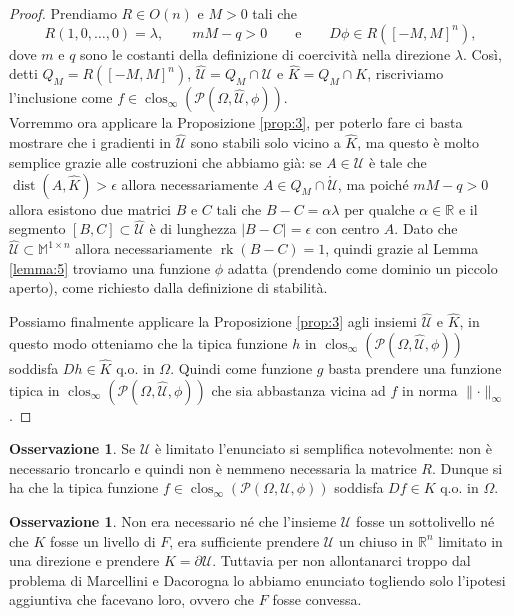 \documentclass[a4paper,11pt]{book}
\theoremstyle{plain}
\theoremstyle{definition}
\newtheorem{oss}[defn]{Osservazione}
\theoremstyle{remark}
\newcommand{\R}{\mathbb{R}}
\newcommand{\M}{\mathbb{M}}
\newcommand{\norm}[1]{\lVert#1\rVert}
\DeclareMathOperator{\rk}{rk}
\DeclareMathOperator{\dist}{dist}
\DeclareMathOperator{\clos}{clos}
\begin{document}
\begin{proof}
	Prendiamo $R\in O(n)$ e $M>0$ tali che
	\[
		R(1,0,\ldots,0)=\lambda,\qquad mM-q>0\qquad\text{e}\qquad D\phi\in R([-M,M]^n),
	\]
	dove $m$ e $q$ sono le costanti della definizione di coercività nella direzione $\lambda$.
	Così, detti $Q_{M}=R([-M,M]^{n})$, $\hat{\mathcal{U}}=Q_{M}\cap\mathcal{U}$ e $\hat{K}=Q_{M}\cap K$, riscriviamo l'inclusione come $f\in\clos_{\infty}(\mathscr{P}(\Omega,\hat{\mathcal{U}},\phi))$.\\
	Vorremmo ora applicare la Proposizione \ref{prop:3}, per poterlo fare ci basta mostrare che i gradienti in $\hat{\mathcal{U}}$ sono stabili solo vicino a $\hat{K}$, ma questo è molto semplice grazie alle costruzioni che abbiamo già: se $A\in\hat{\mathcal{U}}$ è tale che $\dist(A,\hat{K})>\epsilon$ allora necessariamente $A\in Q_{M}\cap\mathring{\mathcal{U}}$, ma poiché $mM-q>0$ allora esistono due matrici $B$ e $C$ tali che $B-C=\alpha\lambda$ per qualche $\alpha\in\R$ e il segmento $[B,C]\subset \hat{\mathcal{U}}$ è di lunghezza $|B-C|=\epsilon$ con centro $A$. Dato che $\hat{\mathcal{U}}\subset\M^{1\times n}$ allora necessariamente $\rk(B-C)=1$, quindi grazie al Lemma \ref{lemma:5} troviamo una funzione $\phi$ adatta (prendendo come dominio un piccolo aperto), come richiesto dalla definizione di stabilità.
		
	Possiamo finalmente applicare la Proposizione \ref{prop:3} agli insiemi $\hat{\mathcal{U}}$ e $\hat{K}$, in questo modo otteniamo che la tipica funzione $h$ in $\clos_{\infty}(\mathscr{P}(\Omega,\hat{\mathcal{U}},\phi))$ soddisfa $Dh\in\hat{K}$ q.o. in $\Omega$. Quindi come funzione $g$ basta prendere una funzione tipica in $\clos_{\infty}(\mathscr{P}(\Omega,\hat{\mathcal{U}},\phi))$ che sia abbastanza vicina ad $f$ in norma $\norm{\cdot}_{\infty}$.
\end{proof}

\begin{oss}
	Se $\mathcal{U}$ è limitato l'enunciato si semplifica notevolmente: non è necessario troncarlo e quindi non è nemmeno necessaria la matrice $R$. Dunque si ha che la tipica funzione $f\in\clos_{\infty}(\mathscr{P}(\Omega,\mathcal{U},\phi))$ soddisfa $Df\in K$ q.o. in $\Omega$.
\end{oss}
\begin{oss}
	Non era necessario né che l'insieme $\mathcal{U}$ fosse un sottolivello né che $K$ fosse un livello di $F$, era sufficiente prendere $\mathcal{U}$ un chiuso in $\R^{n}$ limitato in una direzione e prendere $K=\partial \mathcal{U}$. Tuttavia per non allontanarci troppo dal problema di Marcellini e Dacorogna lo abbiamo enunciato togliendo solo l'ipotesi aggiuntiva che facevano loro, ovvero che $F$ fosse convessa.
\end{oss}




\end{document}

